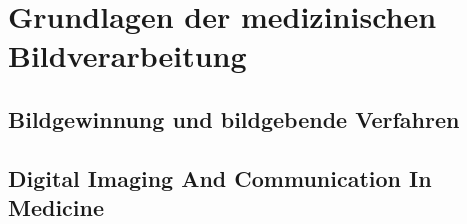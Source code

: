 \chapter{Grundlagen der medizinischen Bildverarbeitung}

\section{Bildgewinnung und bildgebende Verfahren}

\section{Digital Imaging And Communication In Medicine}